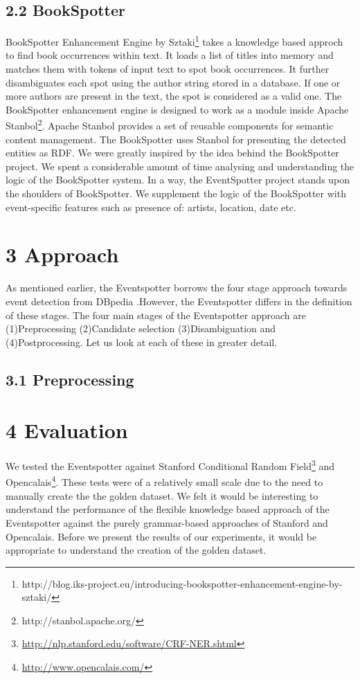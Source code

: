 \documentclass[a4paper,11pt]{report}
\begin{document}
\section*{2.2 BookSpotter}

BookSpotter Enhancement Engine by Sztaki\footnote{http://blog.iks-project.eu/introducing-bookspotter-enhancement-engine-by-sztaki/} takes a knowledge based approch to find book occurrences within text. It loads a list of titles into memory and matches them with tokens of input text to spot book occurrences. It further disambiguates each spot using the author string stored in a database. If one or more authors are present in the text, the spot is considered as a valid one. The BookSpotter enhancement engine is designed to work as a module inside Apache Stanbol\footnote{http://stanbol.apache.org/}. Apache Stanbol provides a set of reusable components for semantic content management. The BookSpotter uses Stanbol for presenting the detected entities as RDF. We were greatly inspired by the idea behind the BookSpotter project. We spent a considerable amount of time  analysing and understanding the logic of the BookSpotter system. In a way, the EventSpotter project stands upon the shoulders of BookSpotter. We supplement the logic of the BookSpotter with event-specific features such as presence of: artists, location, date etc.



\chapter*{3 Approach}
As mentioned earlier, the Eventspotter borrows the four stage approach towards event detection from DBpedia \cite{Mendes11dbpediaspotlight:} .However, the Eventspotter differs in the definition of these stages. The four main stages of the Eventspotter approach are (1)Preprocessing (2)Candidate selection (3)Disambiguation and (4)Postprocessing.
Let us look at each of these in greater detail.
\section*{3.1 Preprocessing}

\chapter*{4 Evaluation}
We tested the Eventspotter against Stanford Conditional Random Field\footnote{\url{http://nlp.stanford.edu/software/CRF-NER.shtml}} and Opencalais\footnote{\url{http://www.opencalais.com/}}. These tests were of a relatively small scale due to the need to manually create the the golden dataset. We felt it would be interesting to understand the performance of the flexible knowledge based approach of the Eventspotter against the purely grammar-based approaches of Stanford and Opencalais. Before we present the results of our experiments, it would be appropriate to understand the creation of the golden dataset. 
\end{document}

